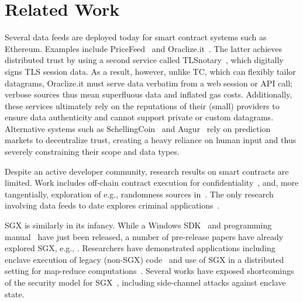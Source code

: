 \section{Related Work}
\label{sec:related}

Several data feeds are deployed today for smart contract systems such as Ethereum. Examples include PriceFeed~\cite{PriceFeed:2016} and Oraclize.it~\cite{Oraclize:2016}. The latter achieves distributed trust by using a second service called TLSnotary~\cite{TLSnotary}, which digitally signs TLS session data. As a result, however, unlike TC, which can flexibly tailor datagrams, Oraclize.it must serve data verbatim from a web session or API call; verbose sources thus mean superfluous data and inflated gas costs. Additionally, these services  ultimately rely on the reputations of their (small) providers to ensure data authenticity and cannot support private or custom datagrams. Alternative systems such as SchellingCoin~\cite{schellingcoin} and Augur~\cite{augur} rely on prediction markets to decentralize trust, creating a heavy reliance on human input and thus severely constraining their scope and data types.  


Despite an active developer community, research results on smart contracts are limited. Work includes off-chain contract execution for confidentiality~\cite{hawk}, and, more tangentially, exploration of e.g., randomness sources in~\cite{bonneau2015bitcoin}. The only research involving data feeds to date explores criminal applications~\cite{gyges}.

SGX is similarly in its infancy.
While a Windows SDK~\cite{sgxsdk} and programming manual~\cite{sgxmanual} have just been released, a number of pre-release papers have already explored SGX, e.g., \cite{VC3,7163052,anati2013innovative,McKeen:2013jv,Phegade:2013km}. Researchers have demonstrated applications including enclave execution of legacy (non-SGX) code~\cite{haven} and use of SGX in a distributed setting for map-reduce computations~\cite{VC3}. Several works have exposed shortcomings of the security model for SGX~\cite{sgxexplained,sgxsok,shihardwaretalk}, including side-channel attacks against enclave state. 


